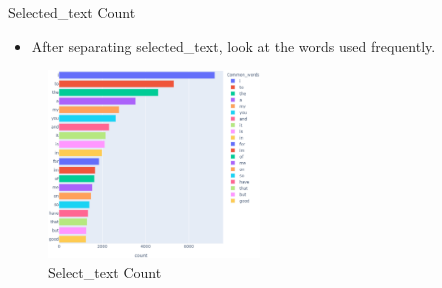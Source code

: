 \documentclass[
 size=14pt,
 paper=smartboard,  %
 mode=present, 		%
 display=slides, 	%
 style=tuliplab,  	%
 pauseslide,
 fleqn,leqno]{powerdot}
\begin{document}
\begin{slide}[toc=,bm=]{Selected_text Count}
  \begin{itemize}
    \item After separating selected_text, look at the words used frequently.
  \end{itemize}
  \begin{figure}[htbp]
    \centering
    \includegraphics[width=0.5\textwidth]{figures//st_count_test.eps}
    \caption{Select_text Count}
  \end{figure}
\end{slide}
\end{document}
